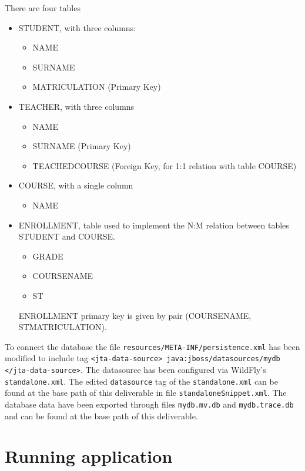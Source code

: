\documentclass{article}
\begin{document}
There are four tables

\begin{itemize}
    \item STUDENT, with three columns:
    \begin{itemize}
        \item NAME
        \item SURNAME
        \item MATRICULATION (Primary Key)
    \end{itemize}
    \item TEACHER, with three columns
    \begin{itemize}
        \item NAME
        \item SURNAME (Primary Key)
        \item TEACHED\textunderscore COURSE (Foreign Key, for 1:1 relation with table COURSE)
    \end{itemize}
    \item COURSE, with a single column
    \begin{itemize}
        \item NAME
    \end{itemize}
    \item ENROLLMENT, table used to implement the N:M relation between tables STUDENT and COURSE.
    \begin{itemize}
        \item GRADE
        \item COURSE\textunderscore NAME
        \item ST \textunderscoreMATRICULATION
    \end{itemize}
    ENROLLMENT primary key is given by pair (COURSE\textunderscore NAME, ST\textunderscore MATRICULATION).
\end{itemize}

To connect the database the file \texttt{resources/META-INF/persistence.xml} has been modified to include tag \texttt{<jta-data-source> java:jboss/datasources/mydb </jta-data-source>}. The datasource has been configured via WildFly's \texttt{standalone.xml}. The edited \texttt{datasource} tag of the \texttt{standalone.xml} can be found at the base path of this deliverable in file \texttt{standaloneSnippet.xml}.
The database data have been exported through files \texttt{mydb.mv.db} and \texttt{mydb.trace.db} and can be found at the base path of this deliverable.

\newpage

\section*{Running application}
\end{document}
